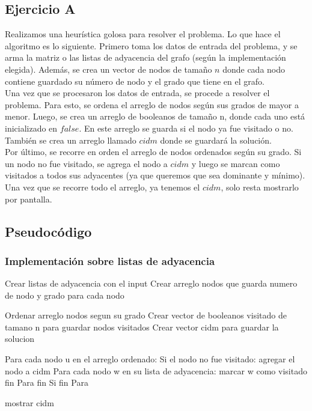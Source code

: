 
\subsection{Ejercicio A}
Realizamos una heurística golosa para resolver el problema. Lo que hace el algoritmo es lo siguiente. Primero toma los datos de entrada del problema, y se arma la matriz o las listas de adyacencia del grafo (según la implementación elegida). Además, se crea un vector de nodos de tamaño $n$ donde cada nodo contiene guardado su número de nodo y el grado que tiene en el grafo. \\ 
Una vez que se procesaron los datos de entrada, se procede a resolver el problema. Para esto, se ordena el arreglo de nodos según sus grados de mayor a menor. Luego, se crea un arreglo de booleanos de tamaño n, donde cada uno está inicializado en $false$. En este arreglo se guarda si el nodo ya fue visitado o no. También se crea un arreglo llamado $cidm$ donde se guardará la solución. \\ 
Por último, se recorre en orden el arreglo de nodos ordenados según su grado. Si un nodo no fue visitado, se agrega el nodo a $cidm$ y luego se marcan como visitados a todos sus adyacentes (ya que queremos que sea dominante y mínimo).
Una vez que se recorre todo el arreglo, ya tenemos el $cidm$, solo resta mostrarlo por pantalla.

\subsection{Pseudocódigo}

\subsubsection{Implementación sobre listas de adyacencia}
\begin{codesnippet}
Crear listas de adyacencia con el input
Crear arreglo nodos que guarda numero de nodo y grado para cada nodo

Ordenar arreglo nodos segun su grado
Crear vector de booleanos visitado de tamano n para guardar nodos visitados
Crear vector cidm para guardar la solucion

Para cada nodo u en el arreglo ordenado:
	Si el nodo no fue visitado:
		agregar el nodo a cidm
		Para cada nodo w en su lista de adyacencia:
			marcar w como visitado
		fin Para
	fin Si
fin Para

mostrar cidm			
\end{codesnippet}

